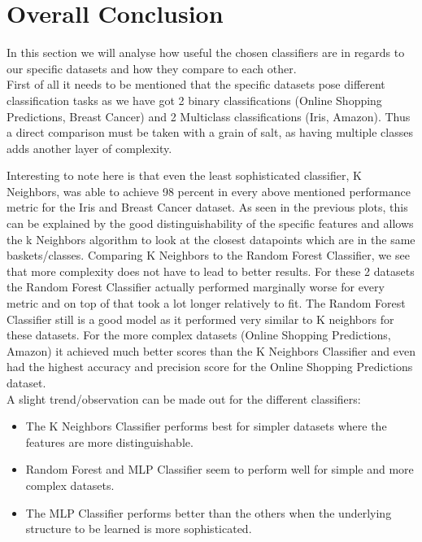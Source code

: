 \newpage
\section{Overall Conclusion}
In this section we will analyse how useful the chosen classifiers are in regards to our specific datasets and how they compare to each other. \\
\newline
First of all it needs to be mentioned that the specific datasets pose different classification tasks as we have got 2 binary classifications (Online Shopping Predictions, Breast Cancer) and 2 Multiclass classifications (Iris, Amazon). Thus a direct comparison must be taken with a grain of salt, as having multiple classes adds another layer of complexity. 

Interesting to note here is that even the least sophisticated classifier, K Neighbors, was able to achieve 98 percent in every above mentioned performance metric for the Iris and Breast Cancer dataset. As seen in the previous plots, this can be explained by the good distinguishability of the specific features and allows the k Neighbors algorithm to look at the closest datapoints which are in the same baskets/classes. 
Comparing K Neighbors  to the Random Forest Classifier, we see that more complexity does not have to lead to better results. For these 2 datasets the Random Forest Classifier actually performed marginally worse for every metric and on top of that took a lot longer relatively to fit. The Random Forest Classifier still is a good model as it performed very similar to K neighbors for these datasets. For the more complex datasets (Online Shopping Predictions, Amazon) it achieved much better scores than the K Neighbors Classifier and even had the highest accuracy and precision score for the Online Shopping Predictions dataset. \\
\newline
A slight trend/observation can be made out for the different classifiers: 
\begin{itemize}
    \item The K Neighbors Classifier performs best for simpler datasets where the features are more distinguishable.
    \item Random Forest and MLP Classifier seem to perform well for simple and more complex datasets.
    \item The MLP Classifier performs better than the others when the underlying structure to be learned is more sophisticated.
\end{itemize} 
